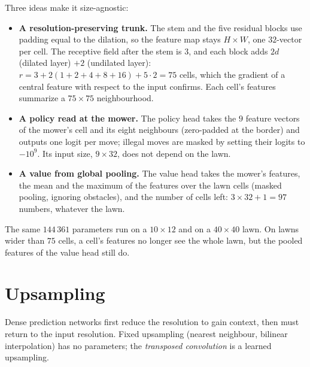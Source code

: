 \begin{notechapter}
Three ideas make it size-agnostic:
\begin{itemize}
  \item \textbf{A resolution-preserving trunk.} The stem and the five residual blocks use
        padding equal to the dilation, so the feature map stays $H\times W$, one $32$-vector per cell.
        The receptive field after the stem is $3$, and each block adds $2d$ (dilated layer) $+ 2$ (undilated
        layer): $r = 3 + 2(1 + 2 + 4 + 8 + 16) + 5\cdot2 = 75$ cells, which the gradient of a central feature with
        respect to the input confirms. Each cell's features summarize a $75\times75$ neighbourhood.
  \item \textbf{A policy read at the mower.} The policy head takes the $9$ feature vectors of the mower's
        cell and its eight neighbours (zero-padded at the border) and outputs one logit per
        move; illegal moves are masked by setting their logits to $-10^9$. Its input size, $9\times32$, does not
        depend on the lawn.
  \item \textbf{A value from global pooling.} The value head takes the mower's features, the mean
        and the maximum of the features over the lawn cells (masked pooling, ignoring
        obstacles), and the number of cells left: $3\times32 + 1 = 97$ numbers, whatever the lawn.
\end{itemize}
The same $144\,361$ parameters run on a $10\times12$ and on a $40\times40$ lawn. On lawns wider than $75$ cells, a
cell's features no longer see the whole lawn, but the pooled features of the value head
still do.

\section{Upsampling}\label{fully-convolutional:sec:upsampling}

Dense prediction networks first reduce the resolution to gain context, then must
return to the input resolution. Fixed upsampling (nearest neighbour, bilinear
interpolation) has no parameters; the \emph{transposed convolution} is a learned upsampling.


\end{notechapter}
